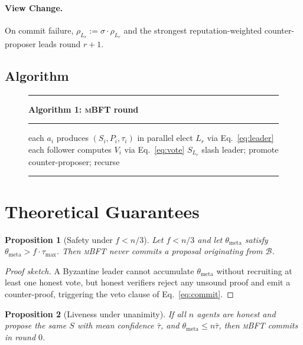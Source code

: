 \documentclass[11pt,conference]{IEEEtran}
\newtheorem{proposition}{Proposition}
\newcommand{\tauconf}{\tau}
\newcommand{\thetameta}{\theta_{\text{meta}}}
\newcommand{\mbft}{\textsc{mBFT}}
\begin{document}
\paragraph*{View Change.}
On commit failure, $\rho_{L_r} \mathrel{:=} \sigma \cdot \rho_{L_r}$ and
the strongest reputation-weighted counter-proposer leads round $r+1$.

\subsection{Algorithm}
\begin{figure}[t]
\hrule\vspace{2pt}
\textbf{Algorithm 1: \mbft{} round}\\[-4pt]
\hrule\vspace{4pt}
\begin{algorithmic}[1]
\State each $a_i$ produces $(S_i, P_i, \tauconf_i)$ in parallel
\State elect $L_r$ via Eq.~\eqref{eq:leader}
\State each follower computes $V_i$ via Eq.~\eqref{eq:vote}
 \State \Return $S_{L_r}$
\Else \State slash leader; promote counter-proposer; recurse
\EndIf
\end{algorithmic}
\vspace{2pt}\hrule
\label{alg:mbft}
\end{figure}

\section{Theoretical Guarantees}
\label{sec:guarantees}

\begin{proposition}[Safety under $f < n/3$]
\label{prop:safety}
Let $f < n/3$ and let $\thetameta$ satisfy
$\thetameta > f \cdot \tauconf_{\max}$. Then \mbft{} never commits a
proposal originating from $\mathcal{B}$.
\end{proposition}
\begin{proof}[Proof sketch]
A Byzantine leader cannot accumulate $\thetameta$ without recruiting at
least one honest vote, but honest verifiers reject any unsound proof and
emit a counter-proof, triggering the veto clause of
Eq.~\eqref{eq:commit}.
\end{proof}

\begin{proposition}[Liveness under unanimity]
\label{prop:liveness}
If all $n$ agents are honest and propose the same $S$ with mean
confidence $\bar\tau$, and $\thetameta \le n\bar\tau$, then \mbft{}
commits in round $0$.
\end{proposition}
\end{document}
